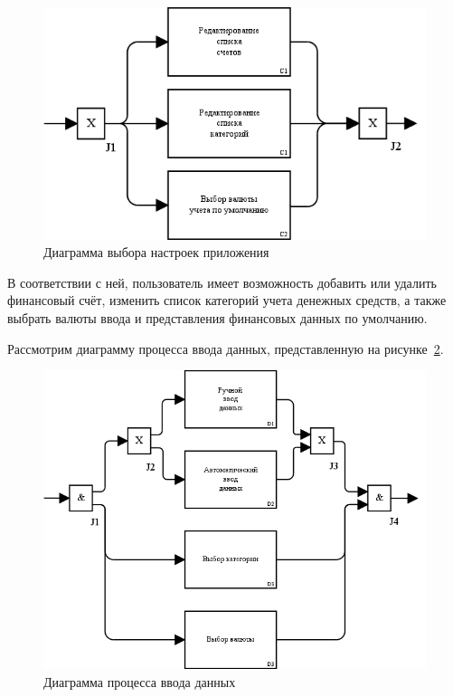 \begin{figure}[h!]
  \centering
  \includegraphics[width=150mm]{pic/idef3_settings}
  \caption{Диаграмма выбора настроек приложения}
  \label{fig:idef3_settings}
\end{figure}

В соответствии с ней, пользователь имеет возможность
добавить или удалить финансовый счёт,
изменить список категорий учета денежных средств,
а также выбрать валюты ввода и представления финансовых
данных по умолчанию.

\pagebreak
Рассмотрим диаграмму процесса ввода данных,
представленную на рисунке~\ref{fig:idef3_input}.

\begin{figure}[h!]
  \centering
  \includegraphics[width=150mm]{pic/idef3_input}
  \caption{Диаграмма процесса ввода данных}
  \label{fig:idef3_input}
\end{figure}


